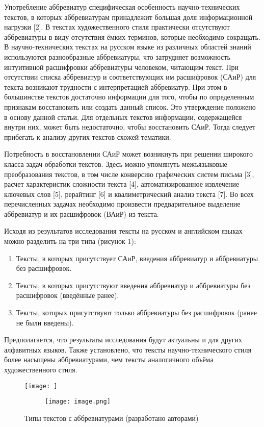 \documentclass{article}
\begin{document}
Употребление аббревиатур специфическая особенность научно-технических текстов, в которых аббревиатурам принадлежит большая доля информационной нагрузки [2]. В текстах художественного стиля практически отсутствуют аббревиатуры в виду отсутствия ёмких терминов, которые необходимо сокращать.
В научно-технических текстах на русском языке из различных областей знаний используются разнообразные аббревиатуры, что затрудняет возможность интуитивной расшифровки аббревиатуры человеком, читающим текст. При отсутствии списка аббревиатур и соответствующих им расшифровок (САиР) для текста возникают трудности с интерпретацией аббревиатур. При этом в большинстве текстов достаточно информации для того, чтобы по определенным признакам восстановить или создать данный список. Это утверждение положено в основу данной статьи. Для отдельных текстов информации, содержащейся внутри них, может быть недостаточно, чтобы восстановить САиР. Тогда следует прибегать к анализу других текстов схожей тематики.

Потребность в восстановлении САиР может возникнуть при решении широкого класса задач обработки текстов. Здесь можно упомянуть межъязыковые преобразования текстов, в том числе конверсию графических систем письма [3], расчет характеристик сложности текста [4], автоматизированное извлечение ключевых слов [5], рерайтинг [6] и квалиметрический анализ текста [7]. Во всех перечисленных задачах необходимо произвести предварительное выделение аббревиатур и их расшифровок (ВАиР) из текста.

Исходя из результатов исследования тексты на русском и английском языках можно разделить на три типа (рисунок 1):
\begin{enumerate}
    \item Тексты, в которых присутствует САиР, введения аббревиатур и аббревиатуры без расшифровок.
    \item Тексты, в которых присутствуют введения аббревиатур и аббревиатуры без расшифровок (введённые ранее).
    \item Тексты, которых присутствуют только аббревиатуры без расшифровок (ранее не были введены).
\end{enumerate}
Предполагается, что результаты исследования будут актуальны и для других алфавитных языков. Также установлено, что тексты научно-технического стиля более насыщены аббревиатурами, чем тексты аналогичного объёма художественного стиля.

\begin{figure}[H]
    \centering
    \texttt{[image: ]}
\begin{figure}
        \centering
        \texttt{[image: image.png]}
    \end{figure}
        \caption{Типы текстов с аббревиатурами (разработано авторами) }
    \label{fig:enter-label}
\end{figure}
\end{document}
